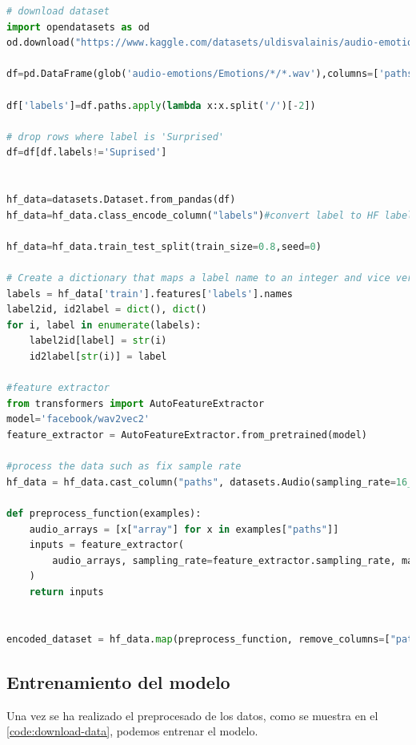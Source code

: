 \begin{lstlisting}[language=Python, caption=Preprocesado del dataset, label={code:download-data}]
# download dataset
import opendatasets as od
od.download("https://www.kaggle.com/datasets/uldisvalainis/audio-emotions")

df=pd.DataFrame(glob('audio-emotions/Emotions/*/*.wav'),columns=['paths'])

df['labels']=df.paths.apply(lambda x:x.split('/')[-2])

# drop rows where label is 'Surprised'
df=df[df.labels!='Suprised']


hf_data=datasets.Dataset.from_pandas(df)
hf_data=hf_data.class_encode_column("labels")#convert label to HF label class

hf_data=hf_data.train_test_split(train_size=0.8,seed=0)

# Create a dictionary that maps a label name to an integer and vice versa. The mapping will help the model recover the label name from the label number:
labels = hf_data['train'].features['labels'].names
label2id, id2label = dict(), dict()
for i, label in enumerate(labels):
    label2id[label] = str(i)
    id2label[str(i)] = label

#feature extractor
from transformers import AutoFeatureExtractor
model='facebook/wav2vec2'
feature_extractor = AutoFeatureExtractor.from_pretrained(model)

#process the data such as fix sample rate
hf_data = hf_data.cast_column("paths", datasets.Audio(sampling_rate=16_000))

def preprocess_function(examples):
    audio_arrays = [x["array"] for x in examples["paths"]]
    inputs = feature_extractor(
        audio_arrays, sampling_rate=feature_extractor.sampling_rate, max_length=16000*2, truncation=True
    )
    return inputs


encoded_dataset = hf_data.map(preprocess_function, remove_columns=["paths"], batched=True)


\end{lstlisting}



\subsection{Entrenamiento del modelo}\label{seccion:entrenamiento-del-modelo}
Una vez se ha realizado el preprocesado de los datos, como se muestra en el \autoref{code:download-data}, podemos entrenar el modelo.

